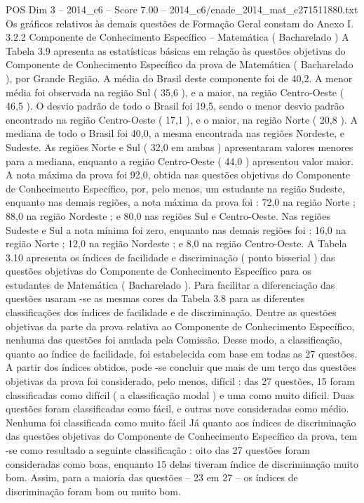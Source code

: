 \begin{textsample}{POS Dim 3 – 2014\_c6 – Score 7.00 – 2014\_c6/enade\_2014\_mat\_c271511880.txt}
Os gráficos relativos às demais questões de Formação Geral constam do Anexo I. 3.2.2 Componente de Conhecimento Específico – Matemática ( Bacharelado ) A Tabela 3.9 apresenta as estatísticas básicas em relação às questões objetivas do Componente de Conhecimento Específico da prova de Matemática ( Bacharelado ), por Grande Região.
A média do Brasil deste componente foi de 40,2.
A menor média foi observada na região Sul ( 35,6 ), e a maior, na região Centro-Oeste ( 46,5 ).
O desvio padrão de todo o Brasil foi 19,5, sendo o menor desvio padrão encontrado na região Centro-Oeste ( 17,1 ), e o maior, na região Norte ( 20,8 ).
A mediana de todo o Brasil foi 40,0, a mesma encontrada nas regiões Nordeste, e Sudeste.
As regiões Norte e Sul ( 32,0 em ambas ) apresentaram valores menores para a mediana, enquanto a região Centro-Oeste ( 44,0 ) apresentou valor maior.
A nota máxima da prova foi 92,0, obtida nas questões objetivas do Componente de Conhecimento Específico, por, pelo menos, um estudante na região Sudeste, enquanto nas demais regiões, a nota máxima da prova foi : 72,0 na região Norte ; 88,0 na região Nordeste ; e 80,0 nas regiões Sul e Centro-Oeste.
Nas regiões Sudeste e Sul a nota mínima foi zero, enquanto nas demais regiões foi : 16,0 na região Norte ; 12,0 na região Nordeste ; e 8,0 na região Centro-Oeste.
A Tabela 3.10 apresenta os índices de facilidade e discriminação ( ponto bisserial ) das questões objetivas do Componente de Conhecimento Específico para os estudantes de Matemática ( Bacharelado ).
Para facilitar a diferenciação das questões usaram -se as mesmas cores da Tabela 3.8 para as diferentes classificações dos índices de facilidade e de discriminação.
Dentre as questões objetivas da parte da prova relativa ao Componente de Conhecimento Específico, nenhuma das questões foi anulada pela Comissão.
Desse modo, a classificação, quanto ao índice de facilidade, foi estabelecida com base em todas as 27 questões.
A partir dos índices obtidos, pode -se concluir que mais de um terço das questões objetivas da prova foi considerado, pelo menos, difícil : das 27 questões, 15 foram classificadas como difícil ( a classificação modal ) e uma como muito difícil.
Duas questões foram classificadas como fácil, e outras nove consideradas como médio.
Nenhuma foi classificada como muito fácil Já quanto aos índices de discriminação das questões objetivas do Componente de Conhecimento Específico da prova, tem -se como resultado a seguinte classificação : oito das 27 questões foram consideradas como boas, enquanto 15 delas tiveram índice de discriminação muito bom.
Assim, para a maioria das questões – 23 em 27 – os índices de discriminação foram bom ou muito bom.

\end{textsample}
